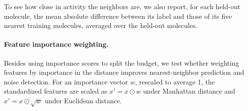 To see how close in activity the neighbors are, we also report, for each held-out molecule, the mean absolute difference between its label and those of its five nearest training molecules, averaged over the held-out molecules.


\paragraph{Feature importance weighting.}

Besides using importance scores to split the budget, we test whether weighting features by importance in the distance improves nearest-neighbor prediction and noise detection. For an importance vector $w$, rescaled to average 1, the standardized features are scaled as $x' = x \odot w$ under Manhattan distance and $x' = x \odot \sqrt{w}$ under Euclidean distance.


